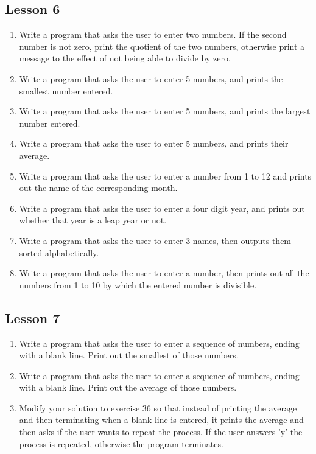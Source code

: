 \documentclass[a4paper,11pt]{article}
\begin{document}
\subsection{Lesson 6}

\begin{enumerate}
	\item Write a program that asks the user to enter two numbers. If the    second number is not zero, print the quotient of the two numbers,    otherwise print a message to the effect of not being able to divide    by zero.
	\item Write a program that asks the user to enter 5 numbers, and    prints the smallest number entered.
	\item Write a program that asks the user to enter 5 numbers, and    prints the largest number entered.
	\item Write a program that asks the user to enter 5 numbers, and    prints their average.
	\item Write a program that asks the user to enter a number from 1 to    12 and prints out the name of the corresponding month.
	\item Write a program that asks the user to enter a four digit year,    and prints out whether that year is a leap year or not.
	\item Write a program that asks the user to enter 3 names, then    outputs them sorted alphabetically.
	\item Write a program that asks the user to enter a number, then    prints out all the numbers from 1 to 10 by which the entered number    is divisible.
\end{enumerate}

\subsection{Lesson 7}

\begin{enumerate}
	\item Write a program that asks the user to enter a sequence of    numbers, ending with a blank line. Print out the smallest of those    numbers.
	\item Write a program that asks the user to enter a sequence of    numbers, ending with a blank line. Print out the average of those    numbers.
	\item Modify your solution to exercise 36 so that instead of printing    the average and then terminating when a blank line is entered, it    prints the average and then asks if the user wants to repeat the    process. If the user answers 'y' the process is repeated, otherwise    the program terminates.
\end{enumerate}
\end{document}
